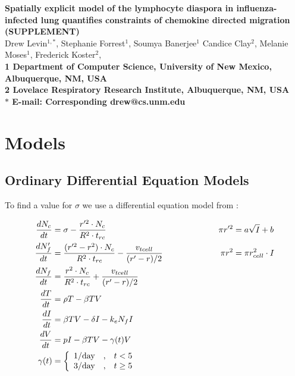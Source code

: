 \documentclass[10pt]{article}
\date{}
\begin{document}
\begin{flushleft}
{\Large
\textbf{Spatially explicit model of the lymphocyte diaspora in influenza-infected lung quantifies constraints of chemokine directed migration (SUPPLEMENT)}
}
\\
Drew Levin$^{1,\ast}$, 
Stephanie Forrest$^{1}$, 
Soumya Banerjee$^{1}$
Candice Clay$^{2}$, 
Melanie Moses$^{1}$, 
Frederick Koster$^{2}$, 
\\
\bf{1} Department of Computer Science, University of New Mexico, Albuquerque, NM, USA
\\
\bf{2} Lovelace Respiratory Research Institute, Albuquerque, NM, USA
\\
$\ast$ E-mail: Corresponding drew@cs.unm.edu
\end{flushleft}


\section*{Models}


\subsection*{Ordinary Differential Equation Models}

To find a value for $\sigma$ we use a differential equation model from \cite{Miao20101}:

\begin{equation*}
\begin{aligned}
\frac{dN_{c}}{dt} &= \sigma - \frac{r'^{2} \cdot N_{c}}{R^{2} \cdot t_{rc}}    & \pi r'^{2} &= a \sqrt{I} + b \\
\frac{dN'_{f}}{dt} &= \frac{(r'^{2} - r^{2}) \cdot N_{c}}{R^{2} \cdot t_{rc}} - \frac{v_{tcell}}{(r' - r) / 2} \hspace*{2cm}  & \pi r^{2} &= \pi r_{cell}^{2} \cdot I \\
\frac{dN_{f}}{dt} &= \frac{r^{2} \cdot N_{c}}{R^{2} \cdot t_{rc}} + \frac{v_{tcell}}{(r' - r) / 2} \\
\frac{dT}{dt} &= \rho T -\beta TV \\
\frac{dI}{dt} &= \beta TV - \delta I - k_{e} N_{f} I \\
\frac{dV}{dt} &= pI - \beta TV - \gamma (t) V \\
\gamma (t) &= \left\{ \begin{array}{rcl}
	1/\mbox{day} & \mbox{,}  & t < 5  \\
	3/\mbox{day} & \mbox{,} & t \geq 5  
	\end{array}\right. \\
\end{aligned}
\end{equation*}
\end{document}
